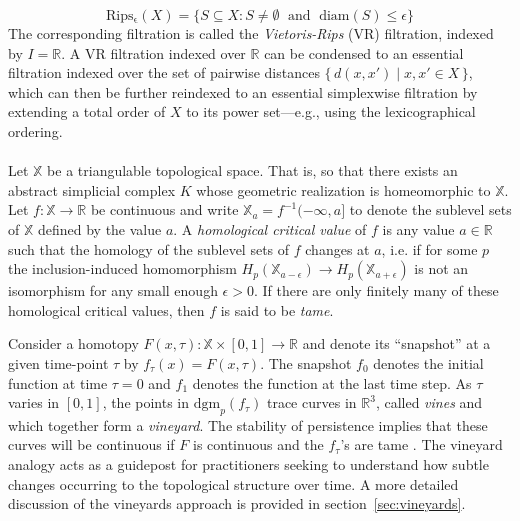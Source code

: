 \documentclass{siamart190516}
\begin{document}
\begin{equation}\label{eq:rips}
	\mathrm{Rips_\epsilon}(X) = \{ S \subseteq X : S \neq \emptyset \;\mbox{ and }\;\mathrm{diam}(S) \leq \epsilon \}
\end{equation} 
The corresponding filtration is called the \emph{Vietoris-Rips} (VR) filtration, indexed by $I = \mathbb{R}$. 
A VR filtration indexed over $\mathbb{R}$  can be condensed to an essential filtration indexed over the set of pairwise distances $\{\, d(x,x') \; | \; x,x' \in X \, \}$, 
which can then be further reindexed to an essential simplexwise filtration by extending a total order of $X$ to its power set---e.g., 
using the lexicographical ordering. 
\\
\\
Let $\mathbb{X}$ be a triangulable topological space. 
That is, so that there exists an abstract 
simplicial complex $K$ whose geometric realization  is homeomorphic to 
$\mathbb{X}$. 
Let  $f: \mathbb{X} \to \mathbb{R}$ be continuous and  
write $\mathbb{X}_a = f^{-1}(-\infty, a]$ to denote the sublevel sets of $\mathbb{X}$ defined by the value $a$. 
A \emph{homological critical value} of $f$ is any value $a \in \mathbb{R}$ such that the homology of the sublevel sets of $f$ changes at $a$, i.e.  if for some $p$ the inclusion-induced homomorphism  $H_p(\mathbb{X}_{a - \epsilon}) \to H_p(\mathbb{X}_{a+\epsilon})$ is not an isomorphism for  any small enough $\epsilon >0$. If there are only finitely many of these homological critical values, then $f$ is said to be \emph{tame}. 

Consider a homotopy $F(x,\tau) : \mathbb{X} \times [0,1] \to \mathbb{R}$ and denote its ``snapshot'' at a given time-point $\tau$ by $f_\tau(x) = F(x,\tau)$.
The snapshot $f_0$ denotes the initial function at time $\tau = 0$ and $f_1$ denotes the function at the last time step. 
As $\tau$ varies in $[0,1]$, the points in $\mathrm{dgm}_p(f_\tau)$ trace  curves in $\mathbb{R}^3$, called \emph{vines} and which together form a \emph{vineyard}. 
The stability of persistence implies that these curves will be continuous if $F$ is continuous
and the $f_\tau$'s are tame \cite{cohen2007stability}.
The vineyard analogy acts as a guidepost for practitioners seeking to understand how subtle changes occurring to the topological structure over time.
A more detailed discussion of the vineyards approach is provided in section~\ref{sec:vineyards}.
\end{document}
